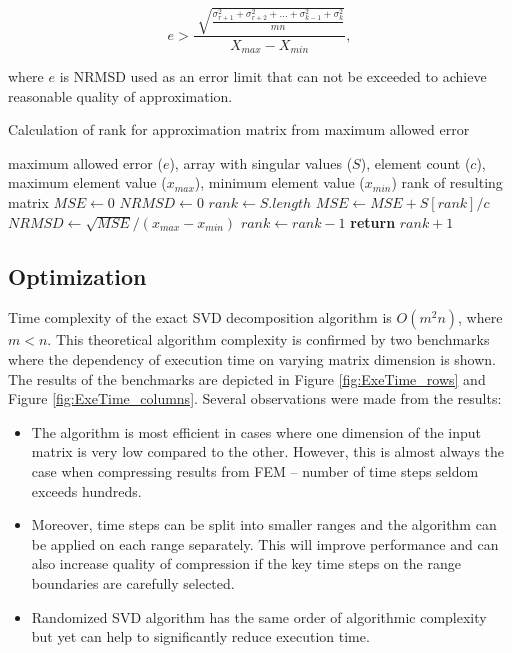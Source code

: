 \begin{equation}
e > \frac{\sqrt[]{\frac{\sigma_{r+1}^{2} + \sigma_{r+2}^{2} + ... + \sigma_{k-1}^{2} + \sigma_{k}^2}{m n}}}{X_{max}-X_{min}},
\end{equation}

\noindent
where $e$ is NRMSD used as an error limit that can not be exceeded to achieve reasonable quality of approximation.

\begin{algorithm}
  \caption{Calculation of rank for approximation matrix from maximum allowed error}\label{rankAlgorithm}
  \label{alg:rank-calculation}
  \begin{algorithmic}[1]
  	\INPUT maximum allowed error ($e$), array with singular values ($S$), element count ($c$), maximum element value ($x_{max}$), minimum element value ($x_{min}$)
    \OUTPUT rank of resulting matrix
      \State $MSE \gets 0$
      \State $NRMSD \gets 0$
      \State $rank \gets S.length$
        \State $MSE \gets MSE + S[rank]/c$ 
        \State $NRMSD \gets \sqrt{MSE} / (x_{max} - x_{min})$ 
        \State $rank \gets rank - 1$ 
      \EndWhile
      \State \textbf{return} $rank + 1$ 
    \EndProcedure
  \end{algorithmic}
\end{algorithm}

\subsection{Optimization}


Time complexity of the exact SVD decomposition algorithm is $O(m^2n)$, where $m<n$. This theoretical algorithm complexity is confirmed by two benchmarks where the dependency of execution time on varying matrix dimension is shown. The results of the benchmarks are depicted in Figure \ref{fig:ExeTime_rows} and Figure \ref{fig:ExeTime_columns}. Several observations were made from the results:

\begin{itemize}
\item The algorithm is most efficient in cases where one dimension of the input matrix is very low compared to the other. However, this is almost always the case when compressing results from FEM -- number of time steps seldom exceeds hundreds.
\item Moreover, time steps can be split into smaller ranges and the algorithm can be applied on each range separately. This will improve performance and can also increase quality of compression if the key time steps on the range boundaries are carefully selected.
\item Randomized SVD algorithm has the same order of algorithmic complexity but yet can help to significantly reduce execution time.
\end{itemize}

